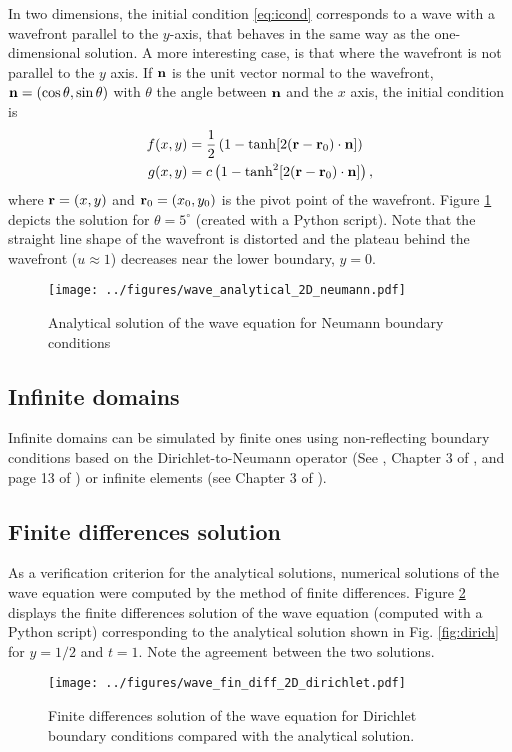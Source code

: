 \documentclass[11pt]{article}
\begin{document}
In two dimensions, the initial condition \eqref{eq:icond} corresponds to a wave with a wavefront parallel to the $y$-axis, that behaves in the same way as the one-dimensional solution. A more interesting case, is that where the wavefront is not parallel to the $y$ axis. If ${\bf n}$ is the unit vector normal to the wavefront, ${\bf n} = (\cos\theta, \sin\theta)$ with $\theta$ the angle between ${\bf n}$ and the $x$ axis, the initial condition is
\begin{subequations}
  \begin{align}
    f(x,y) &= \frac{1}{2}\left(1-\tanh[2({\bf r}-{\bf r}_0)\cdot{\bf n}]\right) \\
    g(x,y) &= c\left(1-\tanh^2[2({\bf r}-{\bf r}_0)\cdot{\bf n}]\right),
  \end{align}
\end{subequations}
where ${\bf r}=(x,y)$ and ${\bf r}_0 = (x_0,y_0)$ is the pivot point of the wavefront. Figure \ref{fig:2D_neumann} depicts the solution for $\theta = 5^\circ$ (created with a Python script). Note that the straight line shape of the wavefront is distorted and the plateau behind the wavefront ($u \approx 1$) decreases near the lower boundary, $y=0$.

\begin{figure}[h]
  \centering
    \texttt{[image: ../figures/wave\_analytical\_2D\_neumann.pdf]} 
  \caption{\label{fig:2D_neumann} Analytical solution of the wave equation for Neumann boundary conditions}
\end{figure}

\subsection{Infinite domains}
Infinite domains can be simulated by finite ones using non-reflecting boundary conditions based on the Dirichlet-to-Neumann operator (See \cite{oberai1998implementation}, Chapter 3 of \cite{ihlenburg1998finite}, and page 13 of \cite{chesnel2025tutorial}) or infinite elements (see Chapter 3 of \cite{ihlenburg1998finite}).

\subsection{Finite differences solution}
As a verification criterion for the analytical solutions, numerical solutions of the wave equation were computed by the method of finite differences. Figure \ref{fig:2D_fd_dirichlet} displays the finite differences solution of the wave equation (computed with a Python script) corresponding to the analytical solution shown in Fig. \ref{fig:dirich} for $y=1/2$ and $t=1$. Note the agreement between the two solutions.
\begin{figure}[h]
  \centering
    \texttt{[image: ../figures/wave\_fin\_diff\_2D\_dirichlet.pdf]} 
  \caption{\label{fig:2D_fd_dirichlet} Finite differences solution of the wave equation for Dirichlet boundary conditions compared with the analytical solution.}
\end{figure}
\end{document}
